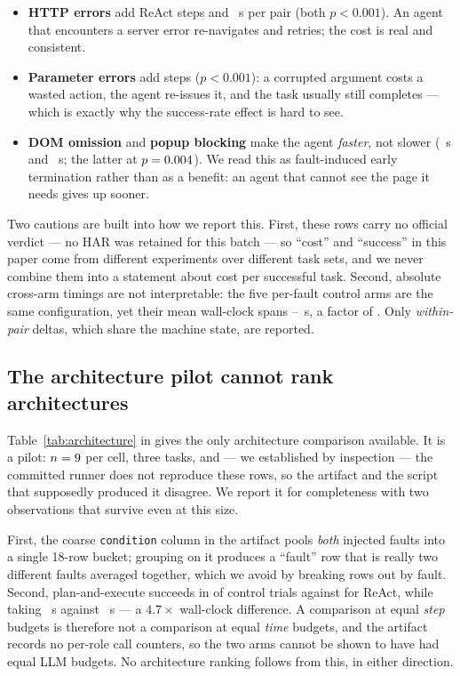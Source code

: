 \begin{itemize}
  \item \textbf{HTTP errors} add \BehWebHttpErrorStepDelta{} ReAct steps and
  \BehWebHttpErrorTimeDelta{}~s per pair (both $p<0.001$). An agent that
  encounters a server error re-navigates and retries; the cost is real and
  consistent.
  \item \textbf{Parameter errors} add \BehAgentParamErrorStepDelta{} steps
  ($p<0.001$): a corrupted argument costs a wasted action, the agent re-issues it,
  and the task usually still completes --- which is exactly why the success-rate
  effect is hard to see.
  \item \textbf{DOM omission} and \textbf{popup blocking} make the agent
  \emph{faster}, not slower (\BehWebDomMissingTimeDelta{}~s and
  \BehWebPopupBlockTimeDelta{}~s; the latter at $p=0.004{}$).
  We read this as fault-induced early termination rather than as a benefit: an
  agent that cannot see the page it needs gives up sooner.
\end{itemize}

Two cautions are built into how we report this. First, these rows carry no
official verdict --- no HAR was retained for this batch --- so ``cost'' and
``success'' in this paper come from different experiments over different task
sets, and we never combine them into a statement about cost per successful task.
Second, absolute cross-arm timings are not interpretable: the five per-fault
control arms are the same configuration, yet their mean wall-clock spans
\NoiseFloorLo--\NoiseFloorHi{}~s, a factor of \NoiseFloorRatio{}. Only
\emph{within-pair} deltas, which share the machine state, are reported.



\subsection{The architecture pilot cannot rank architectures}
\label{sec:res-arch}

Table~\ref{tab:architecture} in  gives the only architecture
comparison available. It is a pilot: $n=9$ per cell, three tasks, and ---
we established by inspection --- the committed runner does not reproduce these
rows, so the artifact and the script that supposedly produced it disagree. We
report it for completeness with two observations that survive even at this size.

First, the coarse \texttt{condition} column in the artifact pools
\emph{both} injected faults into a single 18-row bucket; grouping on it produces a
``fault'' row that is really two different faults averaged together, which we
avoid by breaking rows out by fault. Second, plan-and-execute succeeds in
\ArchPlanCtl{} of \ArchCellN{} control trials against \ArchReactCtl{} for ReAct,
while taking \ArchPlanTime{}~s against \ArchReactTime{}~s --- a $4.7\times$
wall-clock difference. A comparison at equal \emph{step} budgets is therefore not
a comparison at equal \emph{time} budgets, and the artifact records no per-role
call counters, so the two arms cannot be shown to have had equal LLM budgets. No
architecture ranking follows from this, in either direction.

